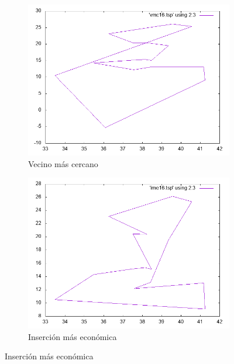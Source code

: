 \documentclass[12pt,spanish]{article}
\begin{document}
\begin{figure}[H]
\centering
\begin{subfigure}[b]{0.36\textwidth}
\includegraphics[width=\textwidth]{ulysses16_vmc.png}
\caption{Vecino más cercano}
\end{subfigure}
\quad
\begin{subfigure}[b]{0.36\textwidth}
\includegraphics[width=\textwidth]{ulysses16_ime.png}
\caption{Inserción más económica}
\end{subfigure}

\vspace{1cm}


\end{figure}
\end{document}
